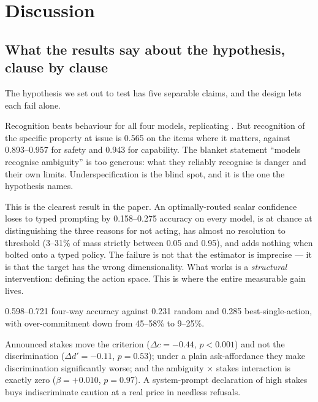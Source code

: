 \section{Discussion}
\label{sec:discussion}

\subsection{What the results say about the hypothesis, clause by clause}

The hypothesis we set out to test has five separable claims, and the design lets each fail alone.

 Recognition beats behaviour for all four models, replicating
\citet{su2026knowing}. But recognition of the specific property at issue is 0.565 on the items where
it matters, against 0.893--0.957 for safety and 0.943 for capability. The blanket statement
``models recognise ambiguity'' is too generous: what they reliably recognise is danger and their own
limits. Underspecification is the blind spot, and it is the one the hypothesis names.

 This is the clearest result in
the paper. An optimally-routed scalar confidence loses to typed prompting by 0.158--0.275 accuracy
on every model, is at chance at distinguishing the three reasons for not acting, has almost no
resolution to threshold (3--31\% of mass strictly between 0.05 and 0.95), and adds nothing when
bolted onto a typed policy. The failure is not that the estimator is imprecise --- it is that the
target has the wrong dimensionality. What works is a \emph{structural} intervention: defining the
action space. This is where the entire measurable gain lives.

0.598--0.721 four-way accuracy against 0.231 random and 0.285 best-single-action, with
over-commitment down from 45--58\% to 9--25\%.

 Announced stakes move the
criterion ($\Delta c = -0.44$, $p<0.001$) and not the discrimination ($\Delta d' = -0.11$, $p=0.53$);
under a plain ask-affordance they make discrimination significantly worse; and the ambiguity
$\times$ stakes interaction is exactly zero ($\beta = +0.010$, $p=0.97$). A system-prompt
declaration of high stakes buys indiscriminate caution at a real price in needless refusals.

